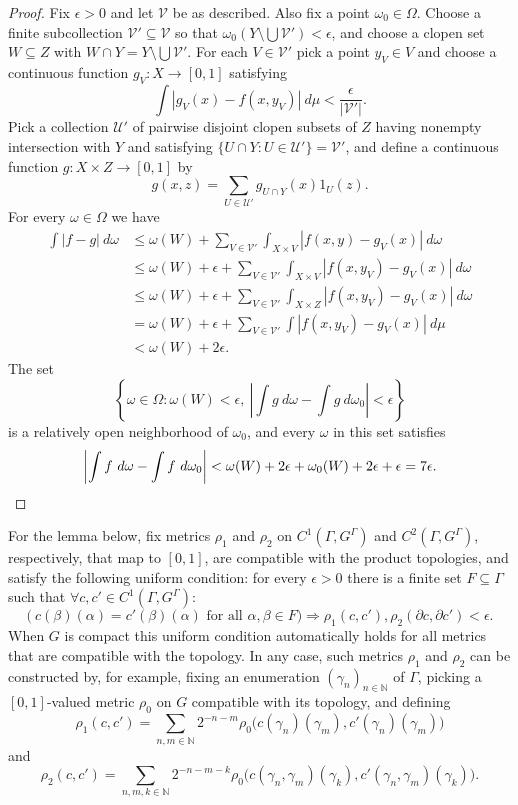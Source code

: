 \documentclass[12pt]{amsart}
\theoremstyle{definition}
\def\cal{\mathcal}
\newcommand\bN{{\mathbb N}}
\begin{document}
\begin{proof}
	Fix $\epsilon > 0$ and let $\cal V$ be as described. Also fix a point $\omega_0 \in \Omega$. Choose a finite subcollection $\cal V' \subseteq \cal V$ so that $\omega_0(Y \setminus \bigcup \cal V') < \epsilon$, and choose a clopen set $W \subseteq Z$ with $W \cap Y = Y \setminus \bigcup \cal V'$. For each $V \in \cal V'$ pick a point $y_V \in V$ and choose a continuous function $g_V : X \rightarrow [0,1]$ satisfying
	\[\int |g_V(x) - f(x,y_V)| \ d \mu < \frac{\epsilon}{|\cal V'|}.\]
	Pick a collection $\cal U'$ of pairwise disjoint clopen subsets of $Z$ having nonempty intersection with $Y$ and satisfying $\{U \cap Y : U \in \cal U'\} = \cal V'$, and define a continuous function $g : X \times Z \rightarrow [0,1]$ by
	\[g(x,z) = \sum_{U \in \cal U'} g_{U \cap Y}(x) 1_U(z).\]
	For every $\omega \in \Omega$ we have
	\begin{align*}
		\int |f-g| \ d \omega & \leq \omega(W) + \sum_{V \in \cal V'} \int_{X \times V} |f(x,y)-g_V(x)| \ d \omega\\
		& \leq \omega(W) + \epsilon + \sum_{V \in \cal V'} \int_{X \times V} |f(x,y_V) - g_V(x)| \ d \omega\\
		& \leq \omega(W) + \epsilon + \sum_{V \in \cal V'} \int_{X \times Z} |f(x,y_V) - g_V(x)| \ d \omega\\
		& = \omega(W) + \epsilon + \sum_{V \in \cal V'} \int |f(x,y_V) - g_V(x)| \ d \mu\\
		& < \omega(W) + 2 \epsilon.
	\end{align*}
	The set
	\[\left\{\omega \in \Omega : \omega(W) < \epsilon, \ \left|\int g \ d \omega - \int g \ d \omega_0 \right| < \epsilon \right\}\]
	is a relatively open neighborhood of $\omega_0$, and every $\omega$ in this set satisfies
	\[\left| \int f \ d \omega - \int f \ d \omega_0 \right| < \omega(W) + 2 \epsilon + \omega_0(W) + 2 \epsilon + \epsilon = 7 \epsilon.\qedhere\]
\end{proof}

For the lemma below, fix metrics $\rho_1$ and $\rho_2$ on $C^1(\Gamma, G^\Gamma)$ and $C^2(\Gamma, G^\Gamma)$, respectively, that map to $[0,1]$, are compatible with the product topologies, and satisfy the following uniform condition: for every $\epsilon > 0$ there is a finite set $F \subseteq \Gamma$ such that $\forall c, c' \in C^1(\Gamma, G^\Gamma)$:
\[\big( \ c(\beta)(\alpha) = c'(\beta)(\alpha)  \text{ for all }\alpha, \beta \in F \big)\Rightarrow \rho_1(c,c'), \rho_2(\partial c, \partial c') < \epsilon.\]
When $G$ is compact this uniform condition automatically holds for all metrics that are compatible with the topology. In any case, such metrics $\rho_1$ and $\rho_2$ can be constructed by, for example, fixing an enumeration $(\gamma_n)_{n \in \bN}$ of $\Gamma$, picking a $[0,1]$-valued metric $\rho_0$ on $G$ compatible with its topology, and defining
\[\rho_1(c,c') = \sum_{n,m \in \bN} 2^{-n-m} \rho_0 \big(c(\gamma_n)(\gamma_m), c'(\gamma_n)(\gamma_m) \big)\]
and
\[\rho_2(c,c') = \sum_{n,m,k \in \bN} 2^{-n-m-k} \rho_0 \big(c(\gamma_n, \gamma_m)(\gamma_k), c'(\gamma_n, \gamma_m)(\gamma_k) \big).\] 
\end{document}
